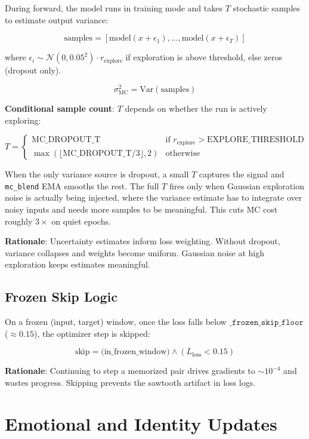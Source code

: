 \documentclass[12pt]{article}
\begin{document}
During forward, the model runs in training mode and takes $T$ stochastic
samples to estimate output variance:

\[
  \text{samples} = [\text{model}(x + \epsilon_1), \ldots,
    \text{model}(x + \epsilon_T)]
\]

where $\epsilon_i \sim \mathcal{N}(0, 0.05^2) \cdot r_{\text{explore}}$
if exploration is above threshold, else zeros (dropout only).

\[
  \sigma^2_{\text{MC}} = \text{Var}(\text{samples})
\]

\textbf{Conditional sample count}: $T$ depends on whether the run is
actively exploring:

\[
  T = \begin{cases}
    \text{MC\_DROPOUT\_T} &
      \text{if } r_{\text{explore}} > \text{EXPLORE\_THRESHOLD} \\
    \max(\lfloor \text{MC\_DROPOUT\_T}/3 \rfloor, 2) &
      \text{otherwise}
  \end{cases}
\]

When the only variance source is dropout, a small $T$ captures the
signal and \texttt{mc\_blend} EMA smooths the rest. The full $T$
fires only when Gaussian exploration noise is actually being injected,
where the variance estimate has to integrate over noisy inputs and
needs more samples to be meaningful. This cuts MC cost roughly $3\times$
on quiet epochs.

\textbf{Rationale}: Uncertainty estimates inform loss weighting. Without
dropout, variance collapses and weights become uniform. Gaussian noise at
high exploration keeps estimates meaningful.

\subsection{Frozen Skip Logic}

On a frozen (input, target) window, once the loss falls below
$\texttt{\_frozen\_skip\_floor}$ ($\approx 0.15$), the optimizer step
is skipped:

\[
  \text{skip} = \text{(in\_frozen\_window)} \land
    (L_{\text{loss}} < 0.15)
\]

\textbf{Rationale}: Continuing to step a memorized pair drives gradients
to $\sim 10^{-4}$ and wastes progress. Skipping prevents the sawtooth
artifact in loss logs.

\section{Emotional and Identity Updates}
\end{document}
